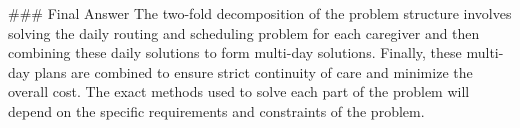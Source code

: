 ### Final Answer
The two-fold decomposition of the problem structure involves solving the daily routing and scheduling problem for each caregiver and then combining these daily solutions to form multi-day solutions. Finally, these multi-day plans are combined to ensure strict continuity of care and minimize the overall cost. The exact methods used to solve each part of the problem will depend on the specific requirements and constraints of the problem.


